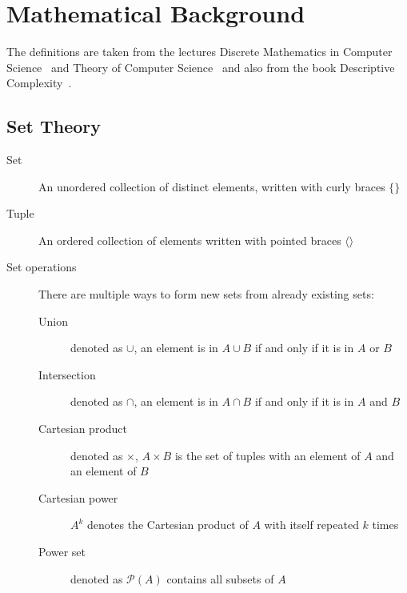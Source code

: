 \chapter{Mathematical Background}\label{ch:mathematical-background}

The definitions are taken from the lectures Discrete Mathematics in Computer Science~\cite{discrete-maths} and Theory of Computer Science~\cite{theory-cs} and also from the book Descriptive Complexity~\cite{descriptive-complexity}.


\section{Set Theory}\label{sec:set-theory}
\begin{description}
    \item[Set] An unordered collection of distinct elements, written with curly braces $\{\}$
    \item[Tuple] An ordered collection of elements written with pointed braces $\langle  \rangle$
    \item[Set operations] There are multiple ways to form new sets from already existing sets:
    \begin{description}
        \item[Union] denoted as $\cup$, an element is in $A \cup B$ if and only if it is in $A$ or $B$
        \item[Intersection] denoted as $\cap$, an element is in $A \cap B$ if and only if it is in $A$ and $B$
        \item[Cartesian product] denoted as $\times$, $A \times B$ is the set of tuples with an element of $A$ and an element of $B$
        \item[Cartesian power] $A^k$ denotes the Cartesian product of $A$ with itself repeated $k$ times
        \item[Power set] denoted as $\mathcal{P}(A)$ contains all subsets of $A$
    \end{description}
\end{description}


